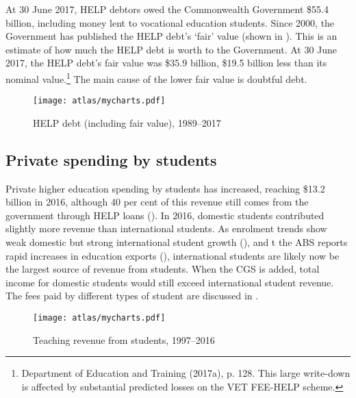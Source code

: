 \documentclass{grattan}
\begin{document}
At 30 June 2017, HELP debtors owed the Commonwealth Government \$55.4 billion, including money lent to vocational education students. Since 2000, the Government has published the HELP debt's `fair' value (shown in ). This is an estimate of how much the HELP debt is worth to the Government. At 30 June 2017, the HELP debt's fair value was \$35.9 billion, \$19.5 billion less than its nominal value.\footnote{Department of Education and Training (2017a), p. 128. This large write-down is affected by substantial predicted losses on the VET FEE-HELP scheme.} The main cause of the lower fair value is doubtful debt.


    \begin{figure} %
    \caption{HELP debt (including fair value), 1989--2017}\label{fig:help-debt-including-fair-value-19892017}
    \texttt{[image: atlas/mycharts.pdf]}
    \end{figure}



%
\subsection{Private spending by students}\label{subsec:private-spending-by-students}

Private higher education spending by students has increased, reaching \$13.2 billion in 2016, although 40 per cent of this revenue still comes from the government through HELP loans (). In 2016, domestic students contributed slightly more revenue than international students. As enrolment trends show weak domestic but strong international student growth (), and t the ABS reports rapid increases in education exports (), international students are likely now be the largest source of revenue from students. When the CGS is added, total income for domestic students would still exceed international student revenue. The fees paid by different types of student are discussed in .


    \begin{figure} %
    \caption{Teaching revenue from students, 1997--2016}\label{fig:teaching-revenue-from-students-19972016}
    \texttt{[image: atlas/mycharts.pdf]}
    \end{figure}
\end{document}
